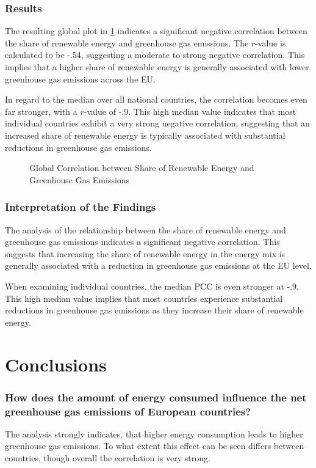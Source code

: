 \documentclass{article}
\begin{document}
\subsubsection*{Results}
The resulting global plot in \cref{plt:global_share_vs_emissions} indicates a significant negative correlation between the share
of renewable energy and greenhouse gas emissions. The $r$-value is calculated to be -.54, suggesting a moderate to strong
negative correlation. This implies that a higher share of renewable energy is generally associated with lower greenhouse gas emissions across the EU.

In regard to the median over all national countries, the correlation becomes even far stronger, with a $r$-value of -.9.
This high median value indicates that most individual countries exhibit a very strong negative correlation,
suggesting that an increased share of renewable energy is typically associated with substantial reductions in greenhouse gas emissions.

\begin{figure}
    \centering
    \resizebox{.7\textwidth}{!}{}
    \caption{Global Correlation between Share of Renewable Energy and Greenhouse Gas Emissions}
    \label{plt:global_share_vs_emissions}
\end{figure}

\subsubsection*{Interpretation of the Findings}
The analysis of the relationship between the share of renewable energy and greenhouse gas emissions indicates a significant negative correlation.
This suggests that increasing the share of renewable energy in the energy mix is generally associated with a reduction in greenhouse gas
emissions at the EU level.

When examining individual countries, the median PCC is even stronger at -.9. This high median value implies that most countries experience
substantial reductions in greenhouse gas emissions as they increase their share of renewable energy.

\section*{Conclusions}
\subsubsection*{How does the amount of energy consumed influence the net greenhouse gas emissions of European countries?}
The analysis strongly indicates, that higher energy consumption leads to higher greenhouse gas emissions.
To what extent this effect can be seen differs between countries, though overall the correlation is very strong.
\end{document}
